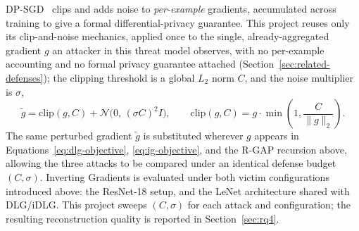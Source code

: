 DP-SGD~\cite{abadi2016dpsgd} clips and adds noise to \emph{per-example}
gradients, accumulated across training to give a formal differential-privacy
guarantee. This project reuses only its clip-and-noise mechanics, applied
once to the single, already-aggregated gradient $g$ an attacker in this
threat model observes, with no per-example accounting and no formal privacy
guarantee attached (Section~\ref{sec:related-defenses}); the clipping
threshold is a global $L_2$ norm $C$, and the noise multiplier is $\sigma$,
\begin{equation}
\tilde{g} = \mathrm{clip}(g, C) + \mathcal{N}\!\big(0,\, (\sigma C)^2 I\big),
\qquad
\mathrm{clip}(g, C) = g \cdot \min\!\left(1, \frac{C}{\lVert g \rVert_2}\right).
\label{eq:dpsgd}
\end{equation}
The same perturbed gradient $\tilde{g}$ is substituted wherever $g$ appears
in Equations~\eqref{eq:dlg-objective}, \eqref{eq:ig-objective}, and the
R-GAP recursion above, allowing the three attacks to
be compared under an identical defense budget $(C, \sigma)$. Inverting
Gradients is evaluated under both victim configurations introduced above:
the ResNet-18 setup, and the LeNet
architecture shared with DLG/iDLG. This project sweeps $(C, \sigma)$ for
each attack and configuration; the resulting reconstruction quality is
reported in Section~\ref{sec:rq4}.
